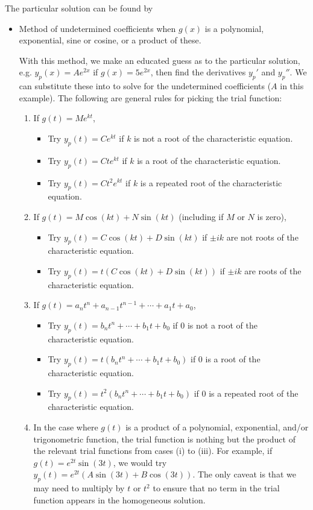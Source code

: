 The particular solution can be found by
\begin{itemize}
	\item Method of undetermined coefficients when $g(x)$ is a polynomial, exponential, sine or cosine, or a product of these.
	
	With this method, we make an educated guess as to the particular solution, e.g. $y_p(x) = Ae^{2x}$ if $g(x) = 5e^{2x}$, then find the derivatives $y_p'$ and $y_p''$. We can substitute these into  to solve for the undetermined coefficients ($A$ in this example). The following are general rules for picking the trial function:
	\begin{enumerate}[label=(\roman*)]
		\item If $g(t) = Me^{kt}$,
		\begin{itemize}
			\item Try $y_p(t) = Ce^{kt}$ if $k$ is not a root of the characteristic equation.
			\item Try $y_p(t) = Cte^{kt}$ if $k$ is a root of the characteristic equation.
			\item Try $y_p(t) = Ct^2e^{kt}$ if $k$ is a repeated root of the characteristic equation.
		\end{itemize}
		\item If $g(t) = M\cos(kt) + N\sin(kt)$ (including if $M$ or $N$ is zero),
		\begin{itemize}
			\item Try $y_p(t) = C\cos(kt) + D\sin(kt)$ if $\pm ik$ are not roots of the characteristic equation.
			\item Try $y_p(t) = t(C\cos(kt) + D\sin(kt))$ if $\pm ik$ are roots of the characteristic equation.
		\end{itemize}
		\item If $g(t) = a_nt^n + a_{n-1}t^{n-1} + \cdots + a_1t + a_0$,
		\begin{itemize}
			\item Try $y_p(t) = b_nt^n + \cdots + b_1t + b_0$ if 0 is not a root of the characteristic equation.
			\item Try $y_p(t) = t(b_nt^n + \cdots + b_1t + b_0)$ if 0 is a root of the characteristic equation.
			\item Try $y_p(t) = t^2(b_nt^n + \cdots + b_1t + b_0)$ if 0 is a repeated root of the characteristic equation.
		\end{itemize}
		\item In the case where $g(t)$ is a product of a polynomial, exponential, and/or trigonometric function, the trial function is nothing but the product of the relevant trial functions from cases (i) to (iii). For example, if $g(t) = e^{2t}\sin(3t)$, we would try $y_p(t) = e^{2t}(A\sin(3t) + B\cos(3t))$. The only caveat is that we may need to multiply by $t$ or $t^2$ to ensure that no term in the trial function appears in the homogeneous solution.
	\end{enumerate}
	

\end{itemize}
